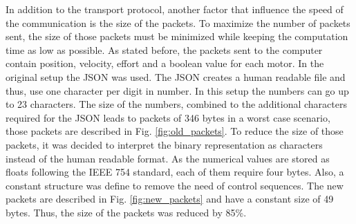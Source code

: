 {{\color{green}
In addition to the transport protocol, another factor that influence the speed of the communication is the size of the packets. To maximize the number of packets sent, the size of those packets must be minimized while keeping the computation time as low as possible. As stated before, the packets sent to the computer contain position, velocity, effort and a boolean value for each motor. In the original setup the JSON was used. The JSON creates a human readable file and thus, use one character per digit in number. In this setup the numbers can go up to 23 characters. The size of the numbers, combined to the additional characters required for the JSON leads to packets of 346 bytes in a worst case scenario, those packets are described in Fig. \ref{fig:old_packets}. To reduce the size of those packets, it was decided to interpret the binary representation as characters instead of the human readable format. As the numerical values are stored as floats following the IEEE 754 standard\cite{IEEE_754}, each of them require four bytes. Also, a constant structure was define to remove the need of control sequences. The new packets are described in Fig. \ref{fig:new_packets} and have a constant size of 49 bytes. Thus, the size of the packets was reduced by 85\%.
}
\begin{figure}[h]
\end{figure}}
